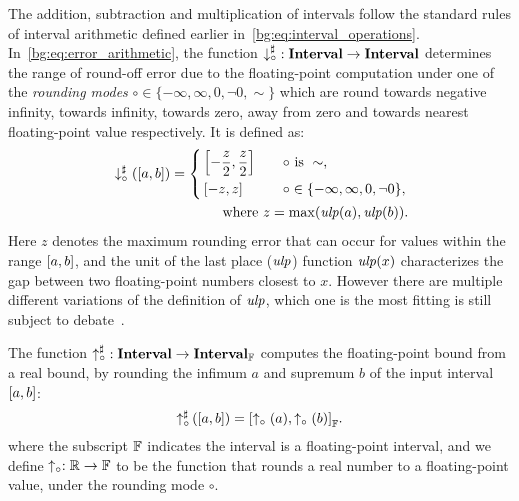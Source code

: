 The addition, subtraction and multiplication of intervals follow
the standard rules of interval arithmetic defined earlier
in~\eqref{bg:eq:interval_operations}.  In~\eqref{bg:eq:error_arithmetic}, the
function $\operatorname{\downarrow^\sharp_\circ}: \mathbf{Interval} \to \mathbf{Interval}$ determines the range
of round-off error due to the floating-point computation under one of the
\emph{rounding modes} $\circ \in \{ -\infty, \infty, 0, \neg0, \sim \}$ which
are round towards negative infinity, towards infinity, towards zero, away from
zero and towards nearest floating-point value respectively.  It is defined as:
\begin{equation}
    \begin{aligned}
        & \downarrow^\sharp_\circ(\left[{a}, {b}\right]) = \left\{
            \begin{aligned}
                & \left[ -\frac{z}{2}, \frac{z}{2}\right]
                    & \quad \circ & \text{~is~}\sim, \\
                & \left[ -z, z\right]
                    & \quad \circ & \in \{ -\infty, \infty, 0, \neg0 \},
            \end{aligned}
        \right. \\
        & \qquad\qquad\qquad\qquad \text{where~} z = \max(\operatorname{\mathit{ulp}}(a), \operatorname{\mathit{ulp}}(b)).
    \end{aligned}
\end{equation}
Here $z$ denotes the maximum rounding error that can occur for values
within the range $\left[{a}, {b}\right]$, and the unit of the last place ($\operatorname{\mathit{ulp}}$)
function $\operatorname{\mathit{ulp}}(x)$ characterizes the gap between two floating-point numbers
closest to $x$.  However there are multiple different variations of the
definition of $\operatorname{\mathit{ulp}}$, which one is the most fitting is still subject to
debate~\cite{muller}\footnotemark[3].

The function $\operatorname{\uparrow^\sharp_\circ}: \mathbf{Interval} \to \mathbf{Interval}_\mathbb{F}$ computes the
floating-point bound from a real bound, by rounding the infimum $a$ and
supremum $b$ of the input interval $\left[{a}, {b}\right]$:
\begin{equation}
    \operatorname{\uparrow^\sharp_\circ}\left(\left[a, b\right]\right)
    = {\left[
        \uparrow_\circ{\left(a\right)},
        \uparrow_\circ{\left(b\right)}
    \right]}_\mathbb{F}.
\end{equation}
where the subscript $\mathbb{F}$ indicates the interval is a floating-point
interval, and we define $\uparrow_\circ: \mathbb{R} \to \mathbb{F}$ to be the
function that rounds a real number to a floating-point value, under the
rounding mode $\circ$.

